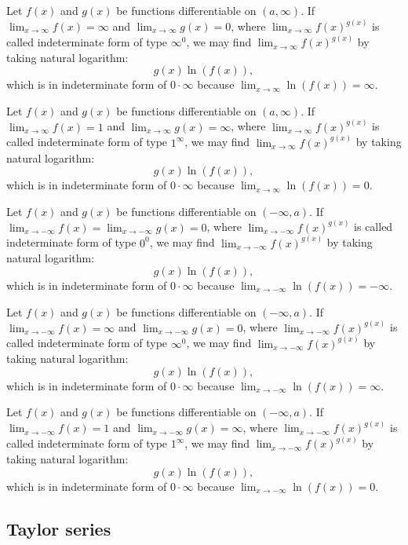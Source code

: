 Let $f(x)$ and $g(x)$ be functions differentiable on $(a,\infty)$. If $\lim_{x\to\infty}f(x)=\infty$ and $\lim_{x\to\infty}g(x)=0$, where $\lim_{x\to\infty}f(x)^{g(x)}$ is called indeterminate form of type $\infty^0$, we may find $\lim_{x\to\infty}f(x)^{g(x)}$ by taking natural logarithm:
\[g(x)\ln(f(x)),\]
which is in indeterminate form of $0\cdot\infty$ because $\lim_{x\to\infty}\ln(f(x))=\infty$.

Let $f(x)$ and $g(x)$ be functions differentiable on $(a,\infty)$. If $\lim_{x\to\infty}f(x)=1$ and $\lim_{x\to\infty}g(x)=\infty$, where $\lim_{x\to\infty}f(x)^{g(x)}$ is called indeterminate form of type $1^{\infty}$, we may find $\lim_{x\to\infty}f(x)^{g(x)}$ by taking natural logarithm:
\[g(x)\ln(f(x)),\]
which is in indeterminate form of $0\cdot\infty$ because $\lim_{x\to\infty}\ln(f(x))=0$.

Let $f(x)$ and $g(x)$ be functions differentiable on $(-\infty,a)$. If $\lim_{x\to -\infty}f(x)=\lim_{x\to -\infty}g(x)=0$, where $\lim_{x\to -\infty}f(x)^{g(x)}$ is called indeterminate form of type $0^0$, we may find $\lim_{x\to -\infty}f(x)^{g(x)}$ by taking natural logarithm:
\[g(x)\ln(f(x)),\]
which is in indeterminate form of $0\cdot\infty$ because $\lim_{x\to -\infty}\ln(f(x))=-\infty$.

Let $f(x)$ and $g(x)$ be functions differentiable on $(-\infty,a)$. If $\lim_{x\to -\infty}f(x)=\infty$ and $\lim_{x\to -\infty}g(x)=0$, where $\lim_{x\to -\infty}f(x)^{g(x)}$ is called indeterminate form of type $\infty^0$, we may find $\lim_{x\to -\infty}f(x)^{g(x)}$ by taking natural logarithm:
\[g(x)\ln(f(x)),\]
which is in indeterminate form of $0\cdot\infty$ because $\lim_{x\to -\infty}\ln(f(x))=\infty$.

Let $f(x)$ and $g(x)$ be functions differentiable on $(-\infty,a)$. If $\lim_{x\to -\infty}f(x)=1$ and $\lim_{x\to -\infty}g(x)=\infty$, where $\lim_{x\to -\infty}f(x)^{g(x)}$ is called indeterminate form of type $1^{\infty}$, we may find $\lim_{x\to -\infty}f(x)^{g(x)}$ by taking natural logarithm:
\[g(x)\ln(f(x)),\]
which is in indeterminate form of $0\cdot\infty$ because $\lim_{x\to -\infty}\ln(f(x))=0$.
\subsection{Taylor series}

